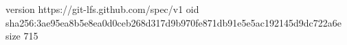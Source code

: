version https://git-lfs.github.com/spec/v1
oid sha256:3ae95ea8b5e8ea0d0ceb268d317d9b970fe871db91e5e5ac192145d9dc722a6e
size 715
